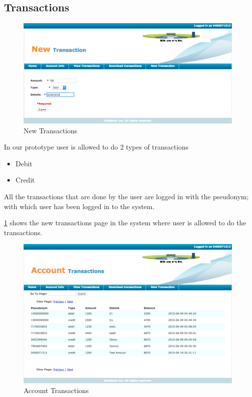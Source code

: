 \subsection{Transactions}
\begin{figure}
	\centering
	\includegraphics[width=\textwidth]{figures/New}
	\caption{New Transactions}
	\label{fig:New}
\end{figure}
In our prototype user is allowed to do 2 types of transactions
\begin{itemize}
	\item Debit
	\item Credit
\end{itemize}
All the transactions that are done by the user are logged in with the pseudonym; with which user has been logged in to the system.

\ref{fig:New} shows the new transactions page in the system where user is allowed to do the transactions.
\begin{figure}[h]
	\centering
	\includegraphics[width=\textwidth]{figures/Transactions}
	\caption{Account Transactions}
	\label{fig:Transactions}
\end{figure}

